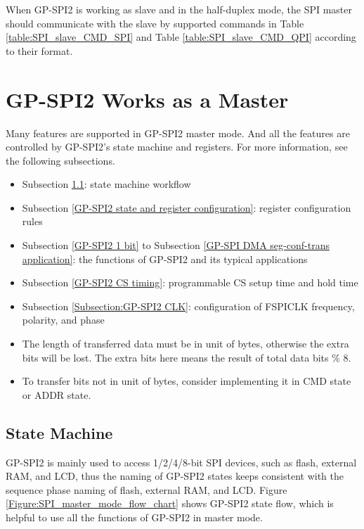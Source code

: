 \documentclass[main\_\_EN.tex]{subfiles}
\begin{document}
When GP-SPI2 is working as slave and in the half-duplex mode, the SPI master should communicate with the slave by supported commands in Table \ref{table:SPI_slave_CMD_SPI} and Table \ref{table:SPI_slave_CMD_QPI} according to their format.


\section{GP-SPI2 Works as a Master}\label{GP-SPI2 master mode}

Many features are supported in GP-SPI2 master mode. And all the features are controlled by GP-SPI2's state machine and registers. For more information, see the following subsections.

\begin{itemize}
    \item Subsection \ref{GP-SPI2 state machine}: state machine workflow
    \item Subsection \ref{GP-SPI2 state and register configuration}: register configuration rules
    \item Subsection \ref{GP-SPI2 1 bit} to Subsection \ref{GP-SPI DMA seg-conf-trans application}: the functions of GP-SPI2 and its typical applications
    \item Subsection \ref{GP-SPI2 CS timing}: programmable CS setup time and hold time
    \item Subsection \ref{Subsection:GP-SPI2 CLK}: configuration of FSPICLK frequency, polarity, and phase
\end{itemize}

\begin{tiplisting}
\vspace{-2em}
\begin{itemize}
    \item The length of transferred data must be in unit of bytes, otherwise the extra bits will be lost. The extra bits here means the result of total data bits \% 8.
    \item To transfer bits not in unit of bytes, consider implementing it in CMD state or ADDR state.
\end{itemize}
\end{tiplisting}

\subsection{State Machine} \label{GP-SPI2 state machine}

GP-SPI2 is mainly used to access 1/2/4/8-bit SPI devices, such as flash, external RAM, and LCD, thus the naming of GP-SPI2 states keeps consistent with the sequence phase naming of flash, external RAM, and LCD. Figure \ref{Figure:SPI_master_mode_flow_chart} shows GP-SPI2 state flow, which is helpful to use all the functions of GP-SPI2 in master mode.
\end{document}
